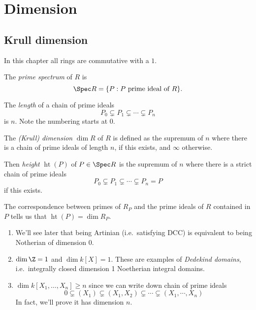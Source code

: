 \documentclass[a4paper]{article}
\DeclareMathOperator{\htt}{ht} %
\begin{document}
\section{Dimension}

\subsection{Krull dimension}

In this chapter all rings are commutative with a \(1\).

\begin{definition}
  The \emph{prime spectrum} of \(R\) is
  \[
    \Spec R = \{P: P \text{ prime ideal of } R\}.
  \]
\end{definition}

\begin{definition}[length]
  The \emph{length} of a chain of prime ideals
  \[
    P_0 \subsetneq P_1 \subsetneq \cdots \subsetneq P_n
  \]
  is \(n\). Note the numbering starts at \(0\).
\end{definition}

\begin{definition}
  The \emph{(Krull) dimension} \(\dim R\) of \(R\) is defined as the supremum of \(n\) where there is a chain of prime ideals of length \(n\), if this exists, and \(\infty\) otherwise.
\end{definition}

\begin{definition}[height]
  Then \emph{height} \(\htt(P)\) of \(P \in \Spec R\) is the supremum of \(n\) where there is a strict chain of prime ideals
  \[
    P_0 \subsetneq P_1 \subsetneq \cdots \subsetneq P_n = P
  \]
  if this exists.
\end{definition}

\begin{note}
  The correspondence between primes of \(R_P\) and the prime ideals of \(R\) contained in \(P\) tells us that \(\htt(P) = \dim R_P\).
\end{note}

\begin{eg}\leavevmode
  \begin{enumerate}
  \item We'll see later that being Artinian (i.e.\ satisfying DCC)  is equivalent to being Notherian of dimension \(0\).
  \item \(\dim \Z = 1\) and \(\dim k[X] = 1\). These are examples of \emph{Dedekind domains}, i.e.\ integrally closed dimension 1 Noetherian integral domains.
  \item \(\dim k[X_1, \dots, X_n] \geq n\) since we can write down chain of prime ideals
    \[
      0 \subsetneq (X_1) \subsetneq (X_1, X_2) \subsetneq \cdots \subsetneq (X_1, \cdots, X_n)
    \]
    In fact, we'll prove it has dimension \(n\).
  \end{enumerate}
\end{eg}
\end{document}
